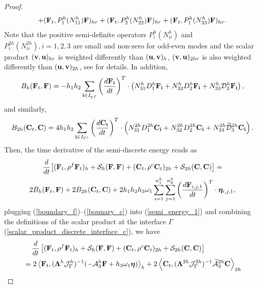 \begin{proof}
\begin{multline*}
+ ({\bf F}_t, P^{h}_1(N_{11}^h){\bf F})_{hr} + ({\bf F}_t, P^{h}_2(N_{22}^h){\bf F})_{hr} + ({\bf F}_t, P^{h}_1(N_{33}^h){\bf F})_{hr}.
\end{multline*}
Note that the positive semi-definite operators $P_i^{h}(N_{ii}^{h})$ and $P_i^{2h}(N_{ii}^{2h}), i = 1,2,3$ are small and non-zero for odd-even modes and the scalar product $({\bf v}, {\bf u})_{hr}$ is weighted differently than $({\bf u}, {\bf v})_h$, $({\bf v}, {\bf u})_{2hr}$ is also weighted differently than $({\bf u}, {\bf v})_{2h}$, see \cite{sjogreen2012fourth, petersson2015wave} for details. In addition,
\begin{equation}\label{boundary_f}
B_h ({\bf F}_t,{\bf F}) = -h_1h_2\sum_{{\bf i}\in I_{\Gamma^f}}\left(\frac{d{\bf F}_{\bf i}}{dt}\right)^T\cdot\left({N}_{31}^h{D}_1^h {\bf F}_{\bf i}+ {N}_{32}^h{D}_2^h{\bf F}_{\bf i}+{N}_{33}^h\mathcal{D}_3^h{\bf F}_{\bf i}\right),
\end{equation}
and similarly, 
\begin{equation}\label{bounary_c}
B_{2h} ({\bf C}_t,{\bf C}) = 4h_1h_2\sum_{{\bf i}\in I_{\Gamma^c}}\left(\frac{d{\bf C}_{\bf i}}{dt}\right)^T\cdot\left({N}_{31}^{2h}{D}_1^{2h}{\bf C}_{\bf i}+{N}_{32}^{2h}{D}_2^{2h}{\bf C}_{\bf i}+{N}_{33}^{2h}\wt{\mathcal{D}}_3^{2h}{\bf C}_{\bf i}\right).
\end{equation}
Then, the time derivative of the semi-discrete energy reads as
\begin{multline}\label{semi_energy_1}
\frac{d}{dt}\big[({\bf F}_t,\rho^f {\bf F}_t)_h + \mathcal{S}_{h}({\bf F},{\bf F}) + ({\bf C}_t,\rho^{c} {\bf C}_t)_{2h} + \mathcal{S}_{2h}({\bf C},{\bf C}) \big]  = \\
2B_{h}({\bf F}_t,{\bf F}) + 2B_{2h}({\bf C}_t,{\bf C}) + 2h_1h_2h_3\omega_1\sum_{i = 1}^{n_1^h}\sum_{j=1}^{n_2^h}\left(\frac{d{\bf F}_{i,j,1}}{dt}\right)^T\cdot{\bm \eta}_{i,j,1},
\end{multline}
plugging (\ref{boundary_f})--(\ref{bounary_c}) into (\ref{semi_energy_1}) and combining the definitions of the scalar product at the interface $\Gamma$ (\ref{scalar_product_discrete_interface_c}), we have
\begin{align*}\label{semi_energy_2}
&\hspace{0.4cm}\frac{d}{dt}\left[({\bf F}_t,\rho^f {\bf F}_t)_{h} + \mathcal{S}_{h}({\bf F},{\bf F}) + ({\bf C}_t,\rho^{c} {\bf C}_t)_{2h} + \mathcal{S}_{2h}({\bf C},{\bf C}) \right]   \nonumber\\
& = 2\left<{\bf F}_t,(\bm{\Lambda}^{h}\mathcal{J}^h_\Gamma)^{-1}(-\mathcal{A}_3^h{\bf F}+h_3\omega_1{\bm \eta})\right>_{h}+ 2\left<{\bf C}_t,(\bm{\Lambda}^{2h}\mathcal{J}^{2h}_\Gamma)^{-1}\wt{\mathcal{A}}_3^{2h}{\bf C}\right>_{2h} \nonumber\\

\end{align*}
\end{proof}
